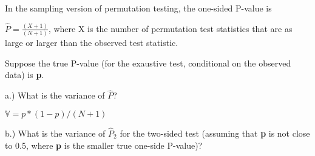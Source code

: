 \documentclass[
  12pt,
]{report}
\begin{document}
In the sampling version of permutation testing, the one-sided P-value is

\(\hat{P} = \frac{(X + 1)}{(N + 1)}\), where X is the number of
permutation test statistics that are as large or larger than the
observed test statistic.

Suppose the true P-value (for the exaustive test, conditional on the
observed data) is \textbf{p}.

a.) What is the variance of \(\hat{P}\)?

\(\mathbb{V} = p*(1 - p) / (N + 1)\)

b.) What is the variance of \(\hat{P}_2\) for the two-sided test
(assuming that \textbf{p} is not close to 0.5, where \textbf{p} is the
smaller true one-side P-value)?
\end{document}
